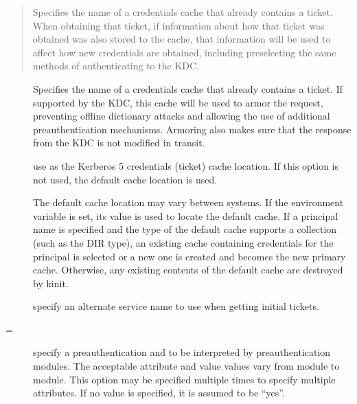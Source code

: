 \documentclass[letterpaper,10pt,english]{sphinxmanual}
\begin{document}
\sphinxAtStartPar
{} 
\begin{quote}

\sphinxAtStartPar
Specifies the name of a credentials cache that already contains a
ticket.  When obtaining that ticket, if information about how that
ticket was obtained was also stored to the cache, that information
will be used to affect how new credentials are obtained, including
preselecting the same methods of authenticating to the KDC.
\end{quote}
\begin{description}
\item[{ }] \leavevmode
\sphinxAtStartPar
Specifies the name of a credentials cache that already contains a
ticket.  If supported by the KDC, this cache will be used to armor
the request, preventing offline dictionary attacks and allowing
the use of additional preauthentication mechanisms.  Armoring also
makes sure that the response from the KDC is not modified in
transit.

\item[{ }] \leavevmode
\sphinxAtStartPar
use  as the Kerberos 5 credentials (ticket) cache
location.  If this option is not used, the default cache location
is used.

\sphinxAtStartPar
The default cache location may vary between systems.  If the
 environment variable is set, its value is used to
locate the default cache.  If a principal name is specified and
the type of the default cache supports a collection (such as the
DIR type), an existing cache containing credentials for the
principal is selected or a new one is created and becomes the new
primary cache.  Otherwise, any existing contents of the default
cache are destroyed by kinit.

\item[{ }] \leavevmode
\sphinxAtStartPar
specify an alternate service name to use when getting initial
tickets.

\item[{ \sphinxstyleemphasis{attribute}{[}=\sphinxstyleemphasis{value}{]}}] \leavevmode
\sphinxAtStartPar
specify a pre\sphinxhyphen{}authentication  and  to be
interpreted by pre\sphinxhyphen{}authentication modules.  The acceptable
attribute and value values vary from module to module.  This
option may be specified multiple times to specify multiple
attributes.  If no value is specified, it is assumed to be “yes”.


\end{description}
\end{document}
